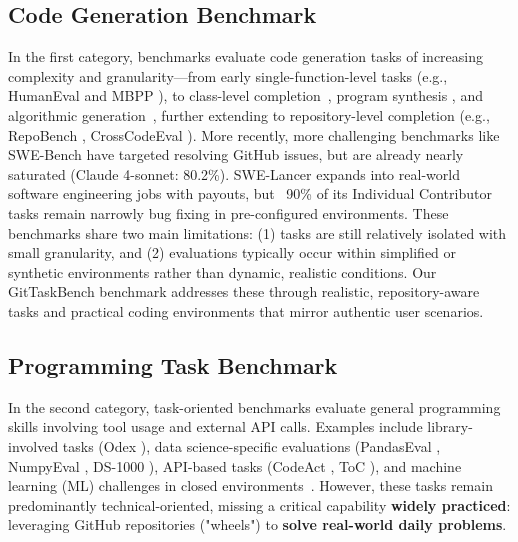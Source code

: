\documentclass[letterpaper]{article} %
\begin{document}
\subsection{Code Generation Benchmark}
In the first category, benchmarks evaluate code generation tasks of increasing complexity and granularity—from early single-function-level tasks (e.g., HumanEval \cite{HumanEval2021} and MBPP \cite{MBPP2021}), to class-level completion~\cite{du2023classeval}, program synthesis \cite{program2021}, and algorithmic generation~\cite{hendrycks2021measuring,2022alphacode}, further extending to repository-level completion (e.g., RepoBench \cite{liu2023repobench}, CrossCodeEval \cite{ding2023crosscodeeval}). 
More recently, more challenging benchmarks like SWE-Bench \cite{jimenez2023swe} have targeted resolving GitHub issues, but are already nearly saturated (Claude 4-sonnet: 80.2\%).
SWE-Lancer \cite{swe-lancer} expands into real-world software engineering jobs with payouts, but ~90\% of its Individual Contributor tasks remain narrowly bug fixing in pre-configured environments. 
These benchmarks share two main limitations: (1) tasks are still relatively isolated with small granularity, and (2) evaluations typically occur within simplified or synthetic environments rather than dynamic, realistic conditions. 
Our GitTaskBench benchmark addresses these through realistic, repository-aware tasks and practical coding environments that mirror authentic user scenarios.

\subsection{Programming Task Benchmark}
In the second category, task-oriented benchmarks evaluate general programming skills involving tool usage and external API calls. Examples include library-involved tasks (Odex \cite{wang2022odex}), data science-specific evaluations (PandasEval \cite{jain2022Pandas}, NumpyEval \cite{zhang2023NumpyEval}, DS-1000 \cite{2023ds-1000}), API-based tasks (CodeAct \cite{codeact}, ToC \cite{ni2024toc}), and machine learning (ML) challenges in closed environments~\cite{liu2018mlbench, tang2023ml-bench, chan2025mle-bench,wang2025all}. However, these tasks remain predominantly technical-oriented, missing a critical capability \textbf{widely practiced}: leveraging GitHub repositories ("wheels") to \textbf{solve real-world daily problems}. 
\end{document}
